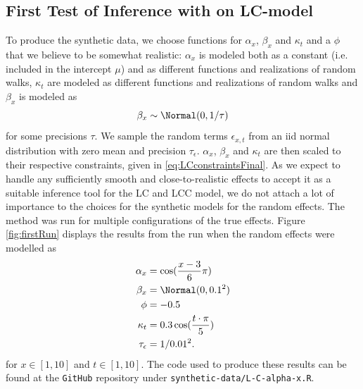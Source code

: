 \subsection{First Test of Inference with \inlabru on LC-model}
\label{sec:synthFirstInferenceLC}
\noindent To produce the synthetic data, we choose functions for $\alpha_x$, $\beta_x$ and $\kappa_t$ and a $\phi$ that we believe to be somewhat realistic: $\alpha_x$ is modeled both as a constant (i.e. included in the intercept $\mu$) and as different functions and realizations of random walks, $\kappa_t$ are modeled as different functions and realizations of random walks and $\beta_x$ is modeled as 
\begin{equation*}
    \beta_x \sim \Normal(0,1/\tau)
\end{equation*} 
for some precisions $\tau$. We sample the random terms $\epsilon_{x,t}$ from an iid normal distribution with zero mean and precision $\tau_\epsilon$. $\alpha_x$, $\beta_x$ and $\kappa_t$ are then scaled to their respective constraints, given in \ref{eq:LCconstraintsFinal}. As we expect \inlabru to handle any sufficiently smooth and close-to-realistic effects to accept it as a suitable inference tool for the LC and LCC model, we do not attach a lot of importance to the choices for the synthetic models for the random effects. 
The \inlabru method was run for multiple configurations of the true effects. Figure \ref{fig:firstRun} displays the results from the run when the random effects were modelled as
\begin{equation}
    \begin{aligned}
    \alpha_x &= \cos(\frac{x-3}{6}\pi)\\
    \beta_x &= \Normal(0,0.1^2)\\
    \phi &= -0.5\\
    \kappa_t &= 0.3\cos(\frac{t\cdot \pi}{5})\\
    \tau_{\epsilon} &= 1/0.01^2.
    \end{aligned}
    \label{eq:conf21}
\end{equation}
for $x\in [1,10]$ and $t \in [1,10]$. The code used to produce these results can be found at the \texttt{GitHub} repository under \texttt{synthetic-data/L-C-alpha-x.R}. 
